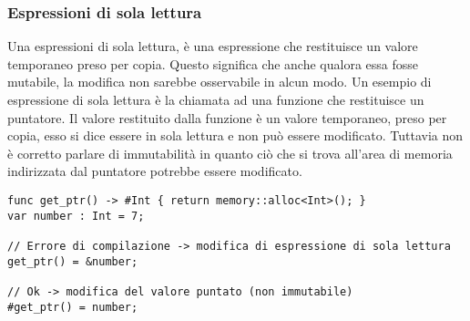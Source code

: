\subsubsection{Espressioni di sola lettura}
Una espressioni di sola lettura, è una espressione che restituisce un valore temporaneo preso per copia. Questo 
significa che anche qualora essa fosse mutabile, la modifica non sarebbe osservabile in alcun modo. Un esempio di 
espressione di sola lettura è la chiamata ad una funzione che restituisce un puntatore. Il valore restituito dalla 
funzione è un valore temporaneo, preso per copia, esso si dice essere in sola lettura e non può essere modificato.
Tuttavia non è corretto parlare di immutabilità in quanto ciò che si trova all'area di memoria indirizzata dal 
puntatore potrebbe essere modificato.

\vspace{0.5cm}
\begin{lstlisting}[frame=single]
func get_ptr() -> #Int { return memory::alloc<Int>(); }
var number : Int = 7;

// Errore di compilazione -> modifica di espressione di sola lettura
get_ptr() = &number;

// Ok -> modifica del valore puntato (non immutabile)
#get_ptr() = number;

\end{lstlisting}
\vspace{0.5cm}
